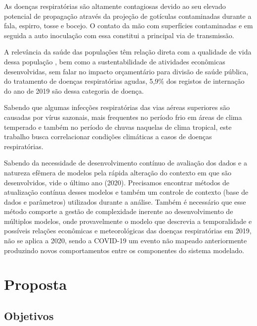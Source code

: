 \documentclass[journal]{IEEEtran}
\begin{document}
As doenças respiratórias são altamente contagiosas devido ao seu elevado potencial de propagação através da projeção de gotículas contaminadas durante a fala, espirro, tosse e bocejo.  O contato da mão com superfícies contaminadas e em seguida a auto inoculação com essa constitui a principal via de transmissão.

A relevância da saúde das populações têm relação direta com a qualidade de vida dessa população \cite{sdgsonu}, bem como a sustentabilidade de atividades econômicas desenvolvidas, sem falar no impacto orçamentário para divisão de saúde pública, do tratamento de doenças respiratórias agudas, 5,9\% dos registos de internação do ano de 2019\cite{ansdoencarespiratoria} são dessa categoria de doença.

Sabendo que algumas infecções respiratórias das vias aéreas superiores são causadas por vírus sazonais, mais frequentes no período frio em áreas de clima temperado e também no período de chuvas naquelas de clima tropical\cite{azevedo_santos_silva_olinda_santos_2017}, este trabalho busca correlacionar condições climáticas a casos de doenças respiratórias.

Sabendo da necessidade de desenvolvimento contínuo de avaliação dos dados e a natureza efêmera de modelos pela rápida alteração do contexto em que são desenvolvidos, vide o último ano (2020). Precisamos encontrar métodos de atualização contínua desses modelos e também um controle de contexto (base de dados e parâmetros) utilizados durante a análise. Também é necessário que esse método comporte a gestão de complexidade inerente ao desenvolvimento de múltiplos modelos, onde provavelmente o modelo que descrevia a temporalidade e possíveis relações econômicas e meteorológicas das doenças respiratórias em 2019, não se aplica a 2020, sendo a COVID-19 um evento não mapeado anteriormente produzindo novos comportamentos entre os componentes do sistema modelado.

 

\section{Proposta}

\subsection{Objetivos}
\end{document}
